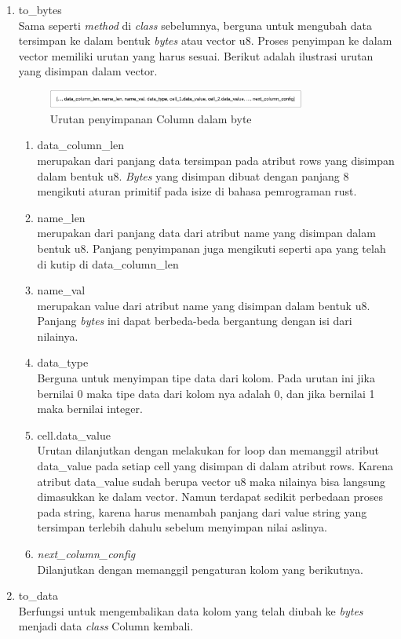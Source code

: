 \begin{enumerate}
	\item to\_bytes \\
	Sama seperti \emph{method} di \emph{class} sebelumnya, berguna untuk mengubah data tersimpan ke dalam bentuk \emph{bytes} atau vector u8. Proses penyimpan ke dalam vector memiliki urutan
  yang harus sesuai. Berikut adalah ilustrasi urutan yang disimpan dalam vector.

  \begin{figure}[H]
	\centering{}
		\includegraphics[width=0.8\textwidth]{gambar/bab4/urutan-penyimpanan-column.png}
	\caption{Urutan penyimpanan Column dalam byte}
	\end{figure}

	\begin{enumerate}
		\item data\_column\_len \\
		merupakan dari panjang data tersimpan pada atribut rows yang disimpan dalam bentuk u8. \emph{Bytes} yang disimpan dibuat dengan panjang 8 mengikuti aturan 
		primitif pada isize di bahasa pemrograman rust.

		\item name\_len \\
		merupakan dari panjang data dari atribut name yang disimpan dalam bentuk u8. Panjang penyimpanan juga mengikuti seperti apa yang telah di kutip di data\_column\_len

		\item name\_val \\
		merupakan value dari atribut name yang disimpan dalam bentuk u8. Panjang \emph{bytes} ini dapat berbeda-beda bergantung dengan isi dari nilainya. 

		\item data\_type \\
		Berguna untuk menyimpan tipe data dari kolom. Pada urutan ini jika bernilai 0 maka tipe data dari kolom nya adalah 0, dan jika bernilai 1 maka bernilai integer.


		\item cell.data\_value \\
		Urutan dilanjutkan dengan melakukan for loop dan memanggil atribut data\_value pada setiap cell yang disimpan di dalam atribut rows. Karena atribut data\_value sudah berupa vector u8 maka
		nilainya bisa langsung dimasukkan ke dalam vector. Namun terdapat sedikit perbedaan proses pada string, karena harus menambah panjang dari value string yang tersimpan terlebih dahulu
		sebelum menyimpan nilai aslinya. 

		\item \emph{next\_column\_config} \\
		Dilanjutkan dengan memanggil pengaturan kolom yang berikutnya.
	\end{enumerate}
  
	\item to\_data \\
	Berfungsi untuk mengembalikan data kolom yang telah diubah ke \emph{bytes} menjadi data \emph{class} Column kembali.
\end{enumerate}

